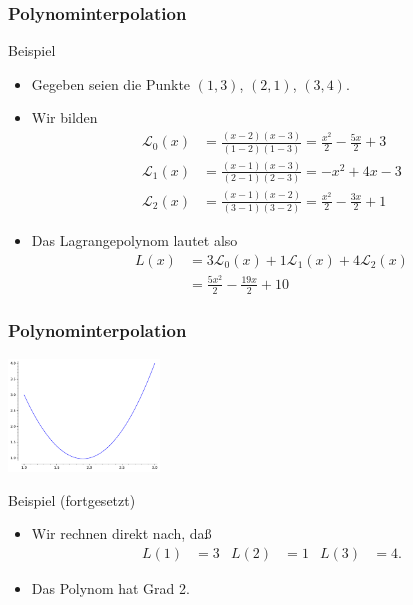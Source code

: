 \documentclass{beamer}
\newcommand\cL{\mathcal L}
\newcommand{\mytitle}{Polynominterpolation}
\begin{document}
\begin{frame}\frametitle{\mytitle}
	\begin{block}{Beispiel}
		\begin{itemize}
			\item Gegeben seien die Punkte $(1,3)$, $(2,1)$, $(3,4)$.
			\item Wir bilden
				\begin{align*}
					\cL_0(x)&=\frac{(x-2)(x-3)}{(1-2)(1-3)}=\frac{x^2}2-\frac{5x}{2}+3\\
					\cL_1(x)&=\frac{(x-1)(x-3)}{(2-1)(2-3)}=-x^2+4x-3\\
					\cL_2(x)&=\frac{(x-1)(x-2)}{(3-1)(3-2)}=\frac{x^2}{2}-\frac{3x}{2}+1
				\end{align*}
			\item Das Lagrangepolynom lautet also
				\begin{align*}
					L(x)&=3\cL_0(x)+1\cL_1(x)+4\cL_2(x)\\
						&=\frac{5x^2}{2}-\frac{19x}{2}+10
				\end{align*}
		\end{itemize}
	\end{block}
\end{frame}

\begin{frame}\frametitle{\mytitle}
	\hfill\includegraphics[height=30mm]{pics/plot_lagpol.pdf}
	\begin{block}{Beispiel (fortgesetzt)}
		\begin{itemize}
			\item Wir rechnen direkt nach, da\ss
				\begin{align*}
					L(1)&=3&L(2)&=1&L(3)&=4.
				\end{align*}
			\item Das Polynom hat Grad 2.
		\end{itemize}
	\end{block}
\end{frame}
\end{document}
